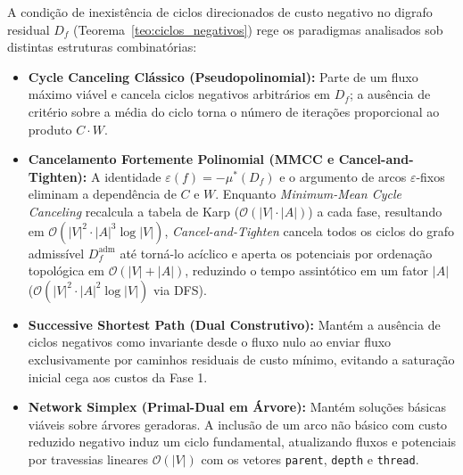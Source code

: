 A condição de inexistência de ciclos direcionados de custo negativo no digrafo residual $D_f$ (Teorema~\ref{teo:ciclos_negativos}) rege os paradigmas analisados sob distintas estruturas combinatórias:
\begin{itemize}
    \item \textbf{Cycle Canceling Clássico (Pseudopolinomial):} Parte de um fluxo máximo viável e cancela ciclos negativos arbitrários em $D_f$; a ausência de critério sobre a média do ciclo torna o número de iterações proporcional ao produto $C \cdot W$.
    \item \textbf{Cancelamento Fortemente Polinomial (MMCC e Cancel-and-Tighten):} A identidade $\varepsilon(f) = -\mu^*(D_f)$ e o argumento de arcos $\varepsilon$-fixos eliminam a dependência de $C$ e $W$. Enquanto \textit{Minimum-Mean Cycle Canceling} recalcula a tabela de Karp ($\mathcal{O}(|V| \cdot |A|)$) a cada fase, resultando em $\mathcal{O}(|V|^2 \cdot |A|^3 \log |V|)$, \textit{Cancel-and-Tighten} cancela todos os ciclos do grafo admissível $D_f^{\text{adm}}$ até torná-lo acíclico e aperta os potenciais por ordenação topológica em $\mathcal{O}(|V| + |A|)$, reduzindo o tempo assintótico em um fator $|A|$ ($\mathcal{O}(|V|^2 \cdot |A|^2 \log |V|)$ via DFS).
    \item \textbf{Successive Shortest Path (Dual Construtivo):} Mantém a ausência de ciclos negativos como invariante desde o fluxo nulo ao enviar fluxo exclusivamente por caminhos residuais de custo mínimo, evitando a saturação inicial cega aos custos da Fase 1.
    \item \textbf{Network Simplex (Primal-Dual em Árvore):} Mantém soluções básicas viáveis sobre árvores geradoras. A inclusão de um arco não básico com custo reduzido negativo induz um ciclo fundamental, atualizando fluxos e potenciais por travessias lineares $\mathcal{O}(|V|)$ com os vetores \lstinline{parent}, \lstinline{depth} e \lstinline{thread}.
\end{itemize}

\vspace{0.8cm}

